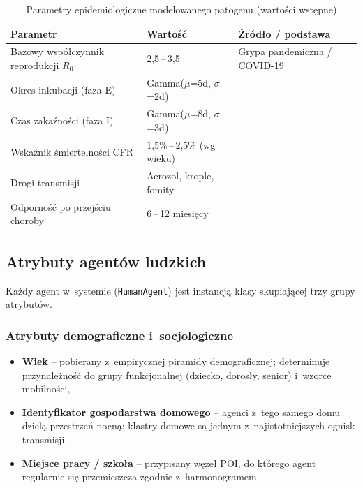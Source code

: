 \documentclass[polish]{projectreport}
\begin{document}
\begin{table}[!htbp]
\centering
\caption{Parametry epidemiologiczne modelowanego patogenu (wartości wstępne)}
\begin{tabularx}{\columnwidth}{@{}lYY@{}} \toprule
  \textbf{Parametr} & \textbf{Wartość} & \textbf{Źródło / podstawa} \\ \midrule
  Bazowy współczynnik reprodukcji $R_0$ & 2,5\,--\,3,5 & Grypa pandemiczna / COVID-19 \\
  Okres inkubacji (faza E) & Gamma($\mu$=5d, $\sigma$=2d) & \cite{zhang2020covid} \\
  Czas zakaźności (faza I) & Gamma($\mu$=8d, $\sigma$=3d) & \cite{lloyd2001realistic} \\
  Wskaźnik śmiertelności CFR & 1,5\%\,--\,2,5\% (wg wieku) & \\
  Drogi transmisji & Aerozol, krople, fomity & \\
  Odporność po przejściu choroby & 6\,--\,12 miesięcy & \\
  \bottomrule
\end{tabularx}
\label{tab:pathogen}
\end{table}

\subsection{Atrybuty agentów ludzkich}
\label{sec:agent-attributes}

Każdy agent w~systemie (\texttt{HumanAgent}) jest instancją klasy skupiającej
trzy grupy atrybutów.

\subsubsection{Atrybuty demograficzne i~socjologiczne}
\label{sec:demo-attrs}

\begin{itemize}
  \item \textbf{Wiek} -- pobierany z~empirycznej piramidy demograficznej;
        determinuje przynależność do grupy funkcjonalnej (dziecko, dorosły,
        senior) i~wzorce mobilności,
  \item \textbf{Identyfikator gospodarstwa domowego} -- agenci z~tego samego
        domu dzielą przestrzeń nocną; klastry domowe są jednym
        z~najistotniejszych ognisk transmisji,
  \item \textbf{Miejsce pracy / szkoła} -- przypisany węzeł POI, do którego
        agent regularnie się przemieszcza zgodnie z~harmonogramem.
\end{itemize}
\end{document}
